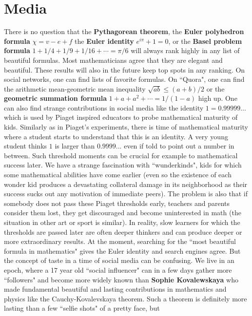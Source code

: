 \documentclass[12pt]{amsart}
\newcounter{example}    \def\example#1{ \item \fontsize{12}{15} \selectfont #1 \fontsize{12}{15} \selectfont }
\begin{document}
\section*{Media} 

There is no question that the {\bf Pythagorean theorem}, the {\bf Euler polyhedron formula} $\chi=v-e+f$
the {\bf Euler identity} $e^{i \pi} + 1 =0$, or the 
{\bf Basel problem formula} $1+1/4+1/9+1/16 + \cdots = \pi/6$ 
will always rank highly in any list of beautiful formulas. 
Most mathematicians agree that they are elegant and beautiful. These results will also
in the future keep top spots in any ranking. On social networks, one can find lists of favorite formulas.
On ``Quora", one can find the arithmetic mean-geometric mean inequality
$\sqrt{ab} \leq (a+b)/2$ or the {\bf geometric summation formula} $1+a+a^2 + \cdots =1/(1-a)$
high up. One can also find strange contributions in social media like the identity 
$1=0.99999\dots$ which is used by Piaget inspired educators to probe mathematical 
maturity of kids. Similarly as in Piaget's experiments, there is time of mathematical maturity
where a student starts to understand that this is an identity. A very young student thinks
$1$ is larger than $0.9999...$ even if told to point out a number in between. Such threshold moments
can be crucial for example to mathematical success later. We have a strange fascination with 
``wunderkinds", kids for which some mathematical abilities have come earlier (even so the existence
of each wonder kid produces a devastating collateral damage in its neighborhood as their success sucks
out any motivation of immediate peers). The problem is also that if somebody does not
pass these Piaget thresholds early, teachers and parents consider them lost, they get discouraged 
and become uninterested in math (the situation in other art or sport is similar). 
In reality, slow learners for which the thresholds are passed
later are often deeper thinkers and can produce deeper or more extraordinary results.
At the moment, searching for the ``most beautiful formula in mathematics"
gives the Euler identity and search engines agree. 
But the concept of taste in a time of social media can be confusing. We live in an epoch, where
a 17 year old ``social influencer" can in a few days gather more ``followers"
and become more widely known than {\bf Sophie Kovalewskaya} who made fundamental beautiful
and lasting contributions in mathematics and physics like the Cauchy-Kovalevskaya theorem.
Such a theorem is definitely more lasting than a few ``selfie shots" of a pretty face, but 
\end{document}
